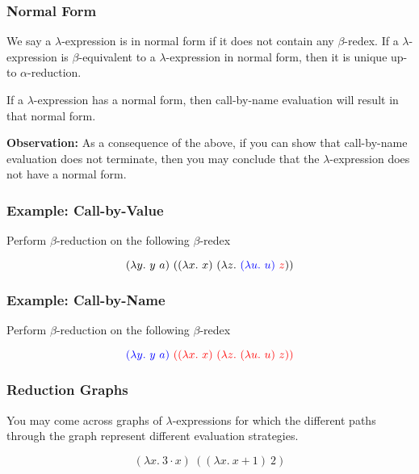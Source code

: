 \documentclass{beamer}
\begin{document}
\begin{frame}
	\frametitle{Normal Form}

	We say a $\lambda$-expression is in normal form if it does not contain any $\beta$-redex. If a $\lambda$-expression is $\beta$-equivalent to a $\lambda$-expression in normal form, then it is unique up-to $\alpha$-reduction. 

	\vspace{0.5cm}

	If a $\lambda$-expression has a normal form, then call-by-name evaluation will result in that normal form. 

	\vspace{0.5cm}

	{\bf Observation:} As a consequence of the above, if you can show that call-by-name evaluation does not terminate, then you may conclude that the $\lambda$-expression does not have a normal form. 

	\vspace{2cm}

\end{frame}

\begin{frame}
	\frametitle{Example: Call-by-Value}

	Perform $\beta$-reduction on the following $\beta$-redex

	$$(\lambda y. \ y \ a) \ ((\lambda x. \ x) \ (\lambda z. \ \textcolor{blue}{(\lambda u. \ u)} \textcolor{red}{ \ z}))$$

	\vspace{6cm}	
		
\end{frame}

\begin{frame}
	\frametitle{Example: Call-by-Name}

	Perform $\beta$-reduction on the following $\beta$-redex

	$$\lamabsarg{(\lambda y. \ y \ a)}{ \ ((\lambda x. \ x) \ (\lambda z. \ (\lambda u. \ u) \ z))}$$

	\vspace{6cm}	
		
\end{frame}

\begin{frame}
	\frametitle{Reduction Graphs}

	You may come across graphs of $\lambda$-expressions for which the different paths through the graph represent different evaluation strategies. 

	$$(\lambda x. \ 3\cdot x) \ ((\lambda x. \ x + 1) \ 2) $$
	\vspace{5cm}

\end{frame}
\end{document}
